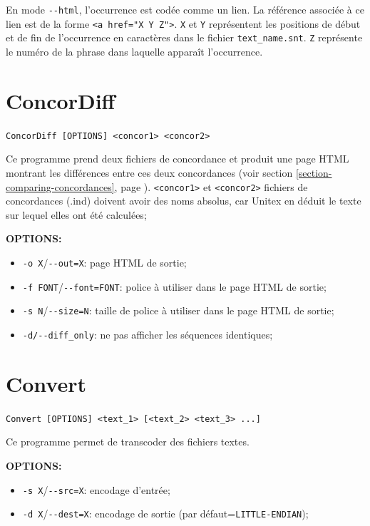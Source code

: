 \bigskip
\noindent En mode \verb+--html+, l’occurrence est codée comme un lien. La référence associée à ce
lien est de la forme \verb+<a href="X Y Z">+. \verb+X+ et \verb+Y+ représentent les positions de
début et de fin de l’occurrence en caractères dans le fichier \verb+text_name.snt+. \verb+Z+
représente le numéro de la phrase dans laquelle apparaît l’occurrence.







\section{ConcorDiff}
\verb+ConcorDiff [OPTIONS] <concor1> <concor2>+

\bigskip
\noindent Ce programme prend deux fichiers de concordance et produit une page HTML montrant les
différences entre ces deux concordances (voir section
\ref{section-comparing-concordances}, page \pageref{section-comparing-concordances}). 
\verb+<concor1>+ et \verb+<concor2>+ fichiers de concordances (.ind) doivent avoir des noms  
absolus, car Unitex en déduit le texte sur lequel elles ont été calculées;

\bigskip
\noindent \textbf{OPTIONS:}
\begin{itemize}
  \item \verb+-o X+/\verb+--out=X+: page HTML de sortie;
  \item \verb+-f FONT+/\verb+--font=FONT+: police à utiliser dans le page HTML de sortie;
  \item \verb+-s N+/\verb+--size=N+: taille de police à utiliser dans le page HTML de sortie;
  \item \verb+-d/--diff_only+: ne pas afficher les séquences identiques;
\end{itemize}







\section{Convert}
\verb+Convert [OPTIONS] <text_1> [<text_2> <text_3> ...]+

\bigskip
\noindent Ce programme permet de transcoder des fichiers textes.

\bigskip
\noindent \textbf{OPTIONS:}
\begin{itemize}
\item \verb+-s X+/\verb+--src=X+: encodage d'entrée;
\item \verb+-d X+/\verb+--dest=X+: encodage de sortie
	(par défaut=\verb$LITTLE-ENDIAN$);
\end{itemize}

